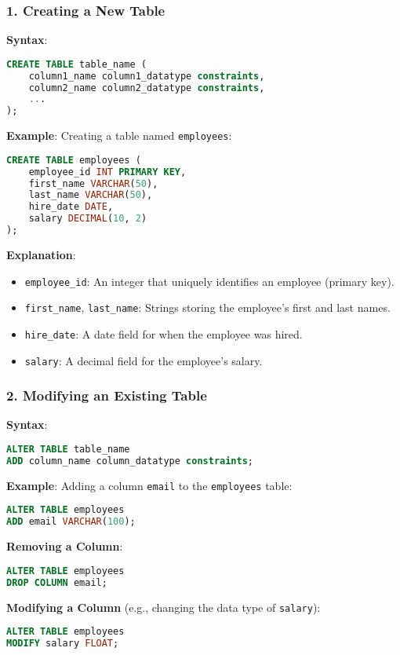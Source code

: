 \documentclass[aspectratio=169]{beamer}
\begin{document}
\begin{frame}[fragile]
    \frametitle{1. Creating a New Table}
    
    \textbf{Syntax}:
    \begin{lstlisting}[language=SQL]
CREATE TABLE table_name (
    column1_name column1_datatype constraints,
    column2_name column2_datatype constraints,
    ...
);
    \end{lstlisting}

    \textbf{Example}:
    Creating a table named \texttt{employees}:
    \begin{lstlisting}[language=SQL]
CREATE TABLE employees (
    employee_id INT PRIMARY KEY,
    first_name VARCHAR(50),
    last_name VARCHAR(50),
    hire_date DATE,
    salary DECIMAL(10, 2)
);
    \end{lstlisting}
    
    \textbf{Explanation}:
    \begin{itemize}
        \item \texttt{employee_id}: An integer that uniquely identifies an employee (primary key).
        \item \texttt{first_name}, \texttt{last_name}: Strings storing the employee's first and last names.
        \item \texttt{hire_date}: A date field for when the employee was hired.
        \item \texttt{salary}: A decimal field for the employee's salary.
    \end{itemize}
\end{frame}

\begin{frame}[fragile]
    \frametitle{2. Modifying an Existing Table}
    
    \textbf{Syntax}:
    \begin{lstlisting}[language=SQL]
ALTER TABLE table_name
ADD column_name column_datatype constraints;
    \end{lstlisting}

    \textbf{Example}: Adding a column \texttt{email} to the \texttt{employees} table:
    \begin{lstlisting}[language=SQL]
ALTER TABLE employees
ADD email VARCHAR(100);
    \end{lstlisting}
    
    \textbf{Removing a Column}:
    \begin{lstlisting}[language=SQL]
ALTER TABLE employees
DROP COLUMN email;
    \end{lstlisting}
    
    \textbf{Modifying a Column} (e.g., changing the data type of \texttt{salary}):
    \begin{lstlisting}[language=SQL]
ALTER TABLE employees
MODIFY salary FLOAT;
    \end{lstlisting}
\end{frame}
\end{document}
